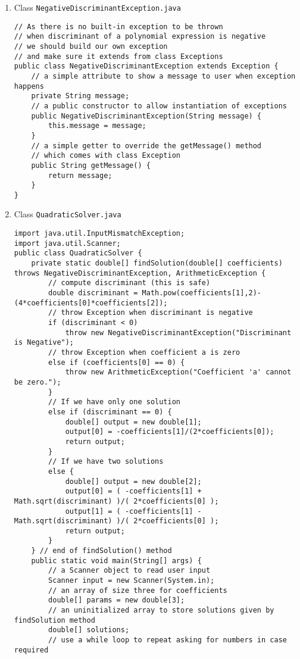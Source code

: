 \documentclass[12pt,letterpaper,twoside]{article}
\begin{document}
\begin{enumerate}
\item Class \texttt{NegativeDiscriminantException.java}
\lstset{language=java, tabsize=2, numbers=left}
\begin{lstlisting}
// As there is no built-in exception to be thrown
// when discriminant of a polynomial expression is negative
// we should build our own exception
// and make sure it extends from class Exceptions
public class NegativeDiscriminantException extends Exception {
	// a simple attribute to show a message to user when exception happens
	private String message;
	// a public constructor to allow instantiation of exceptions
	public NegativeDiscriminantException(String message) {
		this.message = message;
	}
	// a simple getter to override the getMessage() method
	// which comes with class Exception
	public String getMessage() {
		return message;
	}
}
\end{lstlisting}
\item Class \texttt{QuadraticSolver.java}
\begin{lstlisting}
import java.util.InputMismatchException;
import java.util.Scanner;
public class QuadraticSolver {
	private static double[] findSolution(double[] coefficients) throws NegativeDiscriminantException, ArithmeticException {
		// compute discriminant (this is safe)
		double discriminant = Math.pow(coefficients[1],2)-(4*coefficients[0]*coefficients[2]);
		// throw Exception when discriminant is negative
		if (discriminant < 0)
			throw new NegativeDiscriminantException("Discriminant is Negative");
		// throw Exception when coefficient a is zero
		else if (coefficients[0] == 0) {
			throw new ArithmeticException("Coefficient 'a' cannot be zero.");
		}
		// If we have only one solution
		else if (discriminant == 0) {
			double[] output = new double[1];
			output[0] = -coefficients[1]/(2*coefficients[0]);
			return output;
		}
		// If we have two solutions
		else {
			double[] output = new double[2];
			output[0] = ( -coefficients[1] + Math.sqrt(discriminant) )/( 2*coefficients[0] );
			output[1] = ( -coefficients[1] - Math.sqrt(discriminant) )/( 2*coefficients[0] );
			return output;
		}
	} // end of findSolution() method
	public static void main(String[] args) {
		// a Scanner object to read user input
		Scanner input = new Scanner(System.in);
		// an array of size three for coefficients
		double[] params = new double[3];
		// an uninitialized array to store solutions given by findSolution method
		double[] solutions;
		// use a while loop to repeat asking for numbers in case required

\end{lstlisting}
\end{enumerate}
\end{document}
